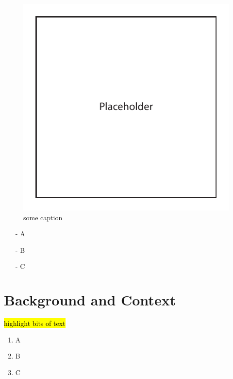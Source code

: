 \documentclass{epsrc}
\begin{document}
\begin{figure}[!htbp]
	\begin{center}
		\includegraphics{img/placeholder_image}
		\vspace{-30pt}
		\caption{some caption}
		\label{fig:full}
	\end{center}
\end{figure}

\lipsum[19-20]

\begin{itemize}
	\item[-]A
	\item[-]B
	\item[-]C
\end{itemize}

\section{Background and Context}

\lipsum[21-22]\hl{highlight bits of text}

\begin{enumerate}[label=\bfseries \arabic*:, align=left]
	\item A
	\item B
	\item C
\end{enumerate}

\lipsum[23-24]
\end{document}
